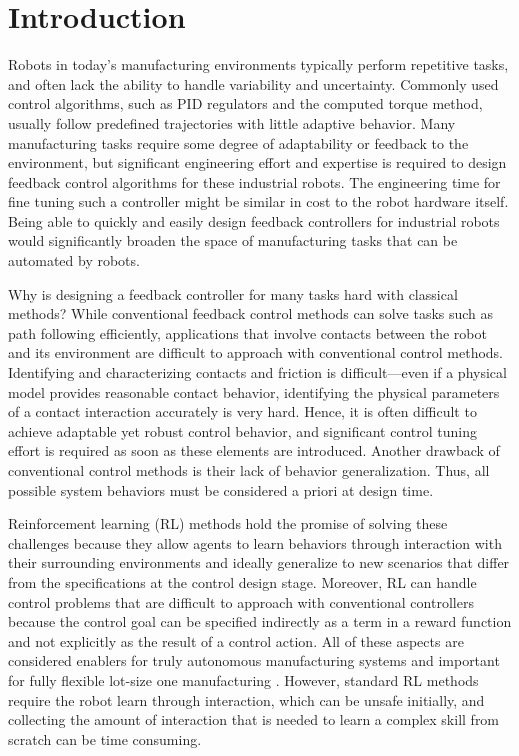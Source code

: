 \section{Introduction}\label{sec:introduction}
%
Robots in today's manufacturing environments typically perform repetitive tasks, and often lack the ability to handle variability and uncertainty. 
Commonly used control algorithms, such as PID regulators and the computed torque method, usually follow predefined trajectories with little adaptive behavior.
Many manufacturing tasks require some degree of adaptability or feedback to the environment, but significant engineering effort and expertise is required to design feedback control algorithms for these industrial robots.
The engineering time for fine tuning such a controller might be similar in cost to the robot hardware itself.
Being able to quickly and easily design feedback controllers for industrial robots would significantly broaden the space of manufacturing tasks that can be automated by robots.

Why is designing a feedback controller for many tasks hard with classical methods? While conventional feedback control methods can solve tasks such as path following efficiently, applications that involve contacts between the robot and its environment are difficult to approach with conventional control methods.
Identifying and characterizing contacts and friction is difficult---even if a physical model provides reasonable contact behavior, identifying the physical parameters of a contact interaction accurately is very hard.
Hence, it is often difficult to achieve adaptable yet robust control behavior, and significant control tuning effort is required as soon as these elements are introduced.
Another drawback of conventional control methods is their lack of behavior generalization.
Thus, all possible system behaviors must be considered a priori at design time.

Reinforcement learning (RL) methods hold the promise of solving these challenges because they allow agents to learn behaviors through interaction with their surrounding environments and ideally generalize to new scenarios that differ from the specifications at the control design stage.
Moreover, RL can handle control problems that are difficult to approach with conventional controllers because the control goal can be specified indirectly as a term in a reward function and not explicitly as the result of a control action.  
All of these aspects are considered enablers for truly autonomous manufacturing systems and important for fully flexible lot-size one manufacturing \cite{lotsizeone}.
However, standard RL methods require the robot learn through interaction, which can be unsafe initially, and collecting the amount of interaction that is needed to learn a complex skill from scratch can be time consuming.

